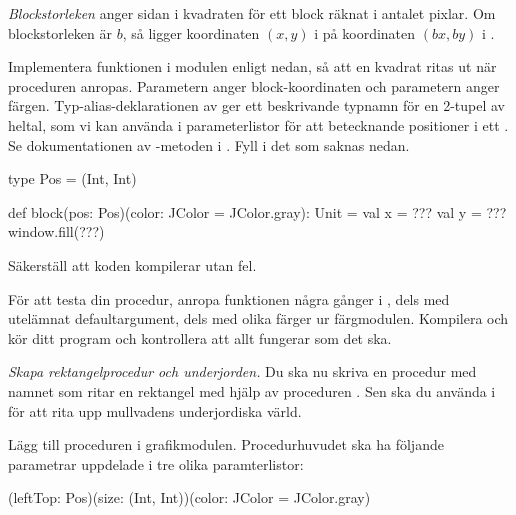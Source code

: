 \begin{framed}
\noindent \emph{Blockstorleken} anger sidan i kvadraten för ett block räknat i antalet pixlar. Om blockstorleken är $b$, så ligger koordinaten $(x, y)$ i  på koordinaten $(bx, by)$ i .

\end{framed}

\noindent Implementera funktionen  i modulen  enligt nedan, så att en kvadrat ritas ut när proceduren anropas. Parametern  anger block-koordinaten och parametern  anger färgen. Typ-alias-deklarationen av  ger ett beskrivande typnamn för en 2-tupel av heltal, som vi kan använda i parameterlistor för att betecknande positioner i ett . Se dokumentationen av -metoden i . Fyll i det som saknas nedan.
\begin{Code}
  type Pos = (Int, Int)

  def block(pos: Pos)(color: JColor = JColor.gray): Unit = {
    val x = ???
    val y = ???
    window.fill(???)
  }
\end{Code}
Säkerställ att koden kompilerar utan fel.


\Subtask
För att testa din procedur, anropa funktionen  några gånger i , dels med utelämnat defaultargument, dels med olika färger ur färgmodulen. Kompilera och kör ditt program och kontrollera att allt fungerar som det ska.



\Task \emph{Skapa rektangelprocedur och underjorden.} Du ska nu skriva en procedur med namnet  som ritar en rektangel med hjälp av proceduren . Sen ska du använda  i  för att rita upp mullvadens underjordiska värld.

\Subtask
Lägg till proceduren  i grafikmodulen. Procedurhuvudet ska ha följande parametrar uppdelade i tre olika paramterlistor:
\begin{Code}
(leftTop: Pos)(size: (Int, Int))(color: JColor = JColor.gray)
\end{Code}

